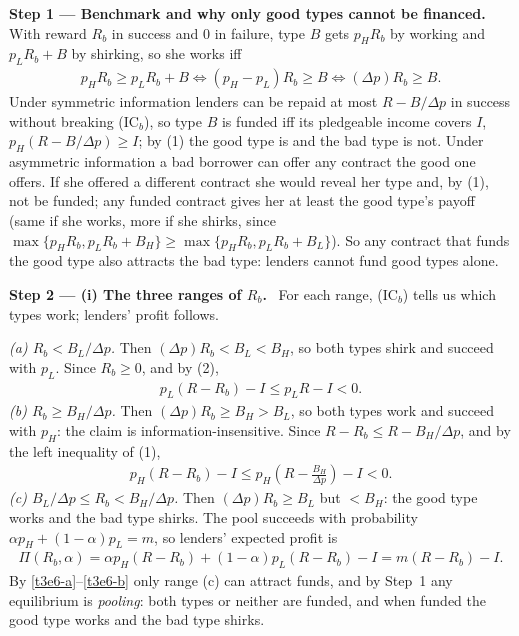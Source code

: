 \documentclass[11pt,a4paper]{article}
\newcommand{\step}[2]{\par\medskip\noindent\textbf{Step #1 --- #2.}~}
\begin{document}
\step{1}{Benchmark and why only good types cannot be financed} With reward $R_b$ in success and 0 in failure, type $B$ gets $p_HR_b$ by working and $p_LR_b+B$ by shirking, so she works iff
\begin{align}
  p_HR_b \ge p_LR_b+B \iff (p_H-p_L)R_b\ge B \iff (\Delta p)R_b\ge B. \tag{IC$_b$}
\end{align}
Under symmetric information lenders can be repaid at most $R-B/\Delta p$ in success without breaking (IC$_b$), so type $B$ is funded iff its pledgeable income covers $I$, $p_H(R-B/\Delta p)\ge I$; by (1) the good type is and the bad type is not. Under asymmetric information a bad borrower can offer any contract the good one offers. If she offered a different contract she would reveal her type and, by (1), not be funded; any funded contract gives her at least the good type's payoff (same if she works, more if she shirks, since $\max\{p_HR_b,p_LR_b+B_H\}\ge\max\{p_HR_b,p_LR_b+B_L\}$). So any contract that funds the good type also attracts the bad type: lenders cannot fund good types alone.

\step{2}{(i) The three ranges of $R_b$} For each range, (IC$_b$) tells us which types work; lenders' profit follows.

\textit{(a) $R_b<B_L/\Delta p$.} Then $(\Delta p)R_b<B_L<B_H$, so both types shirk and succeed with $p_L$. Since $R_b\ge0$, and by (2),
\begin{align}
  p_L(R-R_b)-I \le p_L R - I < 0. \label{t3e6-a}
\end{align}
\textit{(b) $R_b\ge B_H/\Delta p$.} Then $(\Delta p)R_b\ge B_H>B_L$, so both types work and succeed with $p_H$: the claim is information-insensitive. Since $R-R_b\le R-B_H/\Delta p$, and by the left inequality of (1),
\begin{align}
  p_H(R-R_b)-I \le p_H\left(R-\frac{B_H}{\Delta p}\right)-I < 0. \label{t3e6-b}
\end{align}
\textit{(c) $B_L/\Delta p\le R_b<B_H/\Delta p$.} Then $(\Delta p)R_b\ge B_L$ but $<B_H$: the good type works and the bad type shirks. The pool succeeds with probability $\alpha p_H+(1-\alpha)p_L=m$, so lenders' expected profit is
\begin{align}
  \Pi(R_b,\alpha) = \alpha p_H(R-R_b)+(1-\alpha)p_L(R-R_b) - I = m(R-R_b) - I. \label{t3e6-c}
\end{align}
By \eqref{t3e6-a}--\eqref{t3e6-b} only range (c) can attract funds, and by Step~1 any equilibrium is \emph{pooling}: both types or neither are funded, and when funded the good type works and the bad type shirks.
\end{document}
